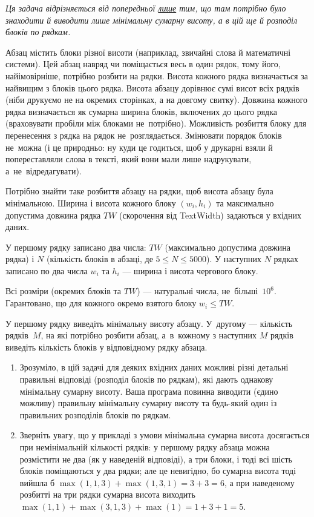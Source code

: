 ﻿{\it Ця задача відрізняється від попередньої \underline{лише} тим, що там потрібно було знаходити й виводити лише мінімальну сумарну висоту, а в цій ще й розподіл блоків по рядкам.}

Абзац містить блоки різної висоти (наприклад, звичайні слова й математичні системи). Цей абзац навряд чи поміщається весь в один рядок, тому його, найімовірніше, потрібно розбити на рядки. Висота кожного рядка визначається за найвищим з блоків цього рядка. Висота абзацу дорівнює сумі висот всіх рядків (ніби друкуємо не на окремих сторінках, а на довгому свитку). Довжина кожного рядка визначається як сумарна ширина блоків, включених до цього рядка (враховувати пробіли між блоками не~потрібно). Можливість розбиття блоку для перенесення з рядка на рядок не~розглядається. Змінювати порядок блоків не~можна (і це природньо: ну куди це годиться, щоб у друкарні взяли й попереставляли слова в тексті, який вони мали лише надрукувати, а~не~відредагувати).

Потрібно знайти таке розбиття абзацу на рядки, щоб висота абзацу була мінімальною. Ширина і висота кожного блоку $(w_i, h_i)$ та максимально допустима довжина рядка $TW$ (скорочення від TextWidth) задаються у вхідних даних.

\InputFile
У першому рядку записано два числа: $TW$ (максимально допустима довжина рядка) і $N$ (кількість блоків в абзаці, де $5\leqslant N\leqslant 5000$). 
У наступних $N$ рядках записано по два числа $w_i$ та $h_i$ — ширина і висота чергового блоку.

Всі розміри (окремих блоків та $TW$) — натуральні числа, не~більші~$10^6$. Гарантовано, що для кожного окремо взятого блоку $w_i\leqslant TW$.

\OutputFile
У першому рядку виведіть мінімальну висоту абзацу. У~другому --- кількість рядків~$M$, на які потрібно розбити абзац, а~в~кожному з наступних $M$ рядків виведіть кількість блоків у відповідному рядку абзаца. 

\Examples
\begin{example}    
\end{example}

\Note
\begin{enumerate}
\item
    Зрозуміло, в цій задачі для деяких вхідних даних можливі різні детальні правильні відповіді (розподіл блоків по рядкам), які дають однакову мінімальну сумарну висоту. Ваша програма повинна виводити (єдино можливу) правильну мінімальну сумарну висоту та будь-який один із правильних розподілів блоків по рядкам.
\item
    Зверніть увагу, що у прикладі з умови мінімальна сумарна висота досягається при немінімальній кількості рядків: у першому рядку абзаца можна розмістити не два (як у наведеній відповіді), а три блоки, і тоді всі шість блоків поміщаються у два рядки; але це невигідно, бо сумарна висота тоді вийшла б 
    $\max(1,1,3)+\max(1,3,1)=3+3=6$, а при наведеному розбитті на три рядки сумарна висота виходить $\max(1,1)+\max(3,1,3)+\max(1)=1+3+1=5$.
\end{enumerate}